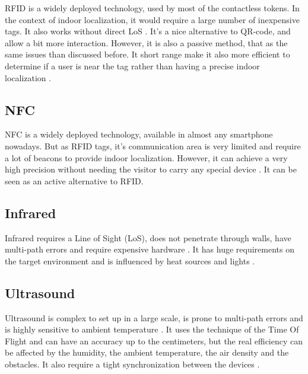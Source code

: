 RFID is a widely deployed technology, used by most of the contactless tokens. In the context of indoor localization, it would require a large number of inexpensive tags. It also works without direct LoS \cite{mainetti_survey_2014}. It's a nice alternative to QR-code, and allow a bit more interaction. However, it is also a passive method, that as the same issues than discussed before. It short range make it also more efficient to determine if a user is near the tag rather than having a precise indoor localization \cite{shang_overview_2022}. 

\subsection{NFC}

NFC is a widely deployed technology, available in almost any smartphone nowadays. But as RFID tags, it's communication area is very limited and require a lot of beacons to provide indoor localization. However, it can achieve a very high precision without needing the visitor to carry any special device \cite{cai_museum_2015}. It can be seen as an active alternative to RFID.



\subsection{Infrared}

Infrared requires a Line of Sight (LoS), does not penetrate through walls, have multi-path errors and require expensive hardware \cite{mainetti_survey_2014}. It has huge requirements on the target environment and is influenced by heat sources and lights \cite{shang_overview_2022}.

\subsection{Ultrasound}

Ultrasound is complex to set up in a large scale, is prone to multi-path errors and is highly sensitive to ambient temperature \cite{mainetti_survey_2014}. It uses the technique of the Time Of Flight and can have an accuracy up to the centimeters, but the real efficiency can be affected by the humidity, the ambient temperature, the air density and the obstacles. It also require a tight synchronization between the devices \cite{shang_overview_2022} \cite{mainetti_survey_2014}.

